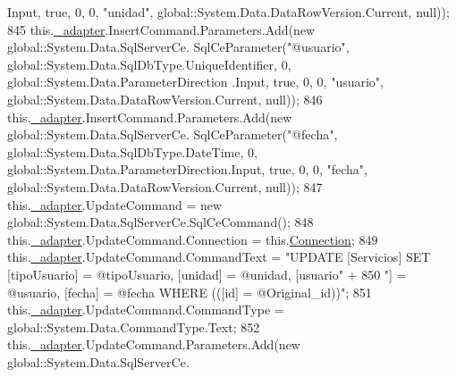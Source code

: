 \begin{DoxyCode}
      Input, \textcolor{keyword}{true}, 0, 0, \textcolor{stringliteral}{"unidad"}, global::System.Data.DataRowVersion.Current, null));
845             this.\hyperlink{class_proyecto___integrador__3_1_1ds_servicios_table_adapters_1_1_servicios_table_adapter_adef36d1c06bafba740cd2cb94515689b}{\_adapter}.InsertCommand.Parameters.Add(\textcolor{keyword}{new} global::System.Data.SqlServerCe.
      SqlCeParameter(\textcolor{stringliteral}{"@usuario"}, global::System.Data.SqlDbType.UniqueIdentifier, 0, global::System.Data.ParameterDirection
      .Input, \textcolor{keyword}{true}, 0, 0, \textcolor{stringliteral}{"usuario"}, global::System.Data.DataRowVersion.Current, null));
846             this.\hyperlink{class_proyecto___integrador__3_1_1ds_servicios_table_adapters_1_1_servicios_table_adapter_adef36d1c06bafba740cd2cb94515689b}{\_adapter}.InsertCommand.Parameters.Add(\textcolor{keyword}{new} global::System.Data.SqlServerCe.
      SqlCeParameter(\textcolor{stringliteral}{"@fecha"}, global::System.Data.SqlDbType.DateTime, 0, global::System.Data.ParameterDirection.Input, \textcolor{keyword}{
      true}, 0, 0, \textcolor{stringliteral}{"fecha"}, global::System.Data.DataRowVersion.Current, null));
847             this.\hyperlink{class_proyecto___integrador__3_1_1ds_servicios_table_adapters_1_1_servicios_table_adapter_adef36d1c06bafba740cd2cb94515689b}{\_adapter}.UpdateCommand = \textcolor{keyword}{new} global::System.Data.SqlServerCe.SqlCeCommand();
848             this.\hyperlink{class_proyecto___integrador__3_1_1ds_servicios_table_adapters_1_1_servicios_table_adapter_adef36d1c06bafba740cd2cb94515689b}{\_adapter}.UpdateCommand.Connection = this.\hyperlink{class_proyecto___integrador__3_1_1ds_servicios_table_adapters_1_1_servicios_table_adapter_afdc3759c0f8fd84ed6ae2943ee4855f5}{Connection};
849             this.\hyperlink{class_proyecto___integrador__3_1_1ds_servicios_table_adapters_1_1_servicios_table_adapter_adef36d1c06bafba740cd2cb94515689b}{\_adapter}.UpdateCommand.CommandText = \textcolor{stringliteral}{"UPDATE [Servicios] SET [tipoUsuario] =
       @tipoUsuario, [unidad] = @unidad, [usuario"} +
850                 \textcolor{stringliteral}{"] = @usuario, [fecha] = @fecha WHERE (([id] = @Original\_id))"};
851             this.\hyperlink{class_proyecto___integrador__3_1_1ds_servicios_table_adapters_1_1_servicios_table_adapter_adef36d1c06bafba740cd2cb94515689b}{\_adapter}.UpdateCommand.CommandType = global::System.Data.CommandType.Text;
852             this.\hyperlink{class_proyecto___integrador__3_1_1ds_servicios_table_adapters_1_1_servicios_table_adapter_adef36d1c06bafba740cd2cb94515689b}{\_adapter}.UpdateCommand.Parameters.Add(\textcolor{keyword}{new} global::System.Data.SqlServerCe.

\end{DoxyCode}
